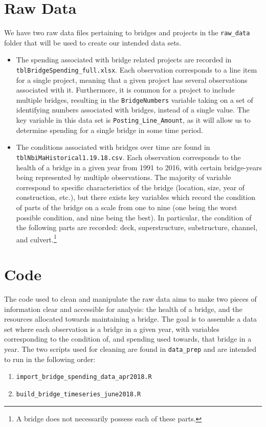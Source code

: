 \documentclass{article}
\begin{document}
\section{Raw Data}
We have two raw data files pertaining to bridges and projects in the \texttt{raw\_data} folder that will be used to create our intended data sets.
\begin{itemize}
	\item The spending associated with bridge related projects are recorded in \texttt{tblBridgeSpending\_full.xlsx}. Each observation corresponds to a line item for a single project, meaning that a given project has several observations associated with it. Furthermore, it is common for a project to include multiple bridges, resulting in the \texttt{BridgeNumbers} variable taking on a set of identifying numbers associated with bridges, instead of a single value. The key variable in this data set is \texttt{Posting\_Line\_Amount}, as it will allow us to determine spending for a single bridge in some time period. 
	\item The conditions associated with bridges over time are found in \texttt{tblNbiMaHistorical1.19.18.csv}. Each observation corresponds to the health of a bridge in a given year from 1991 to 2016, with certain bridge-years being represented by multiple observations. The majority of variable correspond to specific characteristics of the bridge (location, size, year of construction, etc.), but there exists key variables which record the condition of parts of the bridge on a scale from one to nine (one being the worst possible condition, and nine being the best). In particular, the condition of the following parts are recorded: deck, superstructure, substructure, channel, and culvert.\footnote{A bridge does not necessarily possess each of these parts.}  

\end{itemize} 
\section{Code}
The code used to clean and manipulate the raw data aims to make two pieces of information clear and accessible for analysis: the health of a bridge, and the resources allocated towards maintaining a bridge. The goal is to assemble a data set where each observation is a bridge in a given year, with variables corresponding to the condition of, and spending used towards, that bridge in a year.  The two scripts used for cleaning are found in \texttt{data\_prep} and are intended to run in the following order:
\begin{enumerate}
	\item \texttt{import\_bridge\_spending\_data\_apr2018.R}
	\item  \texttt{build\_bridge\_timeseries\_june2018.R} 
\end{enumerate}  
\end{document}
